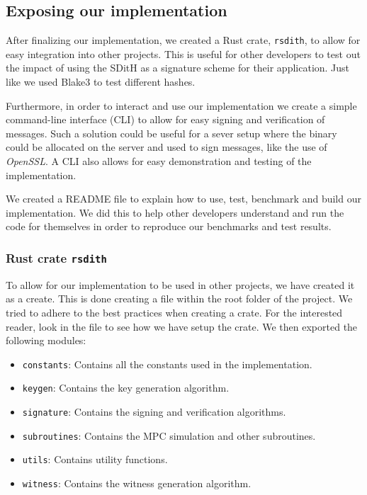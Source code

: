 \documentclass[11pt]{report}
\theoremstyle{definition}
\theoremstyle{plain}
\begin{document}
\subsection{Exposing our implementation}
After finalizing our implementation, we created a Rust crate, \texttt{rsdith}, to allow for easy integration into other projects. This is useful for other developers to test out the impact of using the SDitH as a signature scheme for their application. Just like we used Blake3 to test different hashes.

Furthermore, in order to interact and use our implementation we create a simple command-line interface (CLI) to allow for easy signing and verification of messages. Such a solution could be useful for a sever setup where the binary could be allocated on the server and used to sign messages, like the use of \textit{OpenSSL}. A CLI also allows for easy demonstration and testing of the implementation.

We created a README file to explain how to use, test, benchmark and build our implementation. We did this to help other developers understand and run the code for themselves in order to reproduce our benchmarks and test results.

\subsubsection{Rust crate \texttt{rsdith}}
To allow for our implementation to be used in other projects, we have created it as a create. This is done creating a  file within the root folder of the project. We tried to adhere to the best practices when creating a crate. For the interested reader, look in the  file to see how we have setup the crate.
We then exported the following modules:
\begin{itemize}
  \item \texttt{constants}: Contains all the constants used in the implementation.
  \item \texttt{keygen}: Contains the key generation algorithm.
  \item \texttt{signature}: Contains the signing and verification algorithms.
  \item \texttt{subroutines}: Contains the MPC simulation and other subroutines.
  \item \texttt{utils}: Contains utility functions.
  \item \texttt{witness}: Contains the witness generation algorithm.
\end{itemize}
\end{document}

